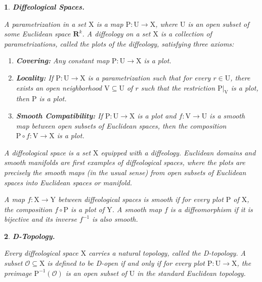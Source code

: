 \documentclass[10pt,reqno,letterpaper,twoside]{amsart}
\theoremstyle{article}
\newtheorem{article}{}
\def\artlabel[#1]{\textbf{#1.}}
\newcommand{\RR}{\mathbf{R}}
\def \P{\mathrm P}
\def \U{\mathrm U}
\def \V{\mathrm V}
\def \X{\mathrm X}
\def \Y{\mathrm Y}
\begin{document}
  \begin{article}
    \artlabel[Diffeological Spaces]
    \label{Diffeological_Spaces}
    
    A \emph{parametrization} in a set $\X$ is a map $\P: \U \to \X$,
    where $\U$ is an open subset of some Euclidean space $\RR^k$.
    A \emph{diffeology} on a set $\X$ is a collection of parametrizations,
    called the \emph{plots of the diffeology},
    satisfying three axioms:
    \begin{enumerate}
      \item \textbf{Covering:} Any constant map $\P: \U \to \X$ is a plot.
      \item \textbf{Locality:} If $\P: \U \to \X$ is a parametrization such that for every $r \in \U$,
      there exists an open neighborhood $\V \subseteq \U$ of $r$ such that the restriction $\P|_\V$ is a plot,
      then $\P$ is a plot.
      \item \textbf{Smooth Compatibility:} If $\P: \U \to \X$ is a plot and $f: \V \to \U$ is a smooth map between open subsets of Euclidean spaces,
      then the composition $\P \circ f: \V \to \X$ is a plot.
    \end{enumerate}
    A \emph{diffeological space} is a set $\X$ equipped with a diffeology.
    Euclidean domains and smooth manifolds are first examples of diffeological spaces,
    where the plots are precisely the smooth maps (in the usual sense) from open subsets of Euclidean spaces into Euclidean spaces or manifold.
    
    A map $f: \X \to \Y$ between diffeological spaces is \emph{smooth} if for every plot $\P$ of $\X$, the composition $f \circ \P$ is a plot of $\Y$.
    A smooth map $f$ is a \emph{diffeomorphism} if it is bijective and its inverse $f^{-1}$ is also smooth.
    
  \end{article}
  
  
  \begin{article}
    \artlabel[D-Topology]
    \label{D-Topology}
    
    Every diffeological space $\X$ carries a natural topology,
    called the \emph{D-topology}.
    A subset $\mathcal{O} \subseteq \X$ is defined to be \emph{D-open} if and only if for every plot $\P: \U \to \X$,
    the preimage $\P^{-1}(\mathcal{O})$ is an open subset of $\U$ in the standard Euclidean topology.
    
  \end{article}
  
\end{document}
